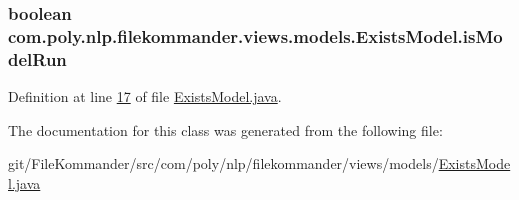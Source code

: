 \hypertarget{classcom_1_1poly_1_1nlp_1_1filekommander_1_1views_1_1models_1_1_exists_model_aa20f1308ab4764740262516e4c0b544e}{
\subsubsection[{is\-Model\-Run}]{\setlength{\rightskip}{0pt plus 5cm}boolean com.\-poly.\-nlp.\-filekommander.\-views.\-models.\-Exists\-Model.\-is\-Model\-Run\hspace{0.3cm}{\ttfamily [private]}}}\label{classcom_1_1poly_1_1nlp_1_1filekommander_1_1views_1_1models_1_1_exists_model_aa20f1308ab4764740262516e4c0b544e}


Definition at line \hyperlink{L17}{17} of file \hyperlink{}{Exists\-Model.\-java}.



The documentation for this class was generated from the following file\-:\begin{DoxyCompactItemize}
\item 
git/\-File\-Kommander/src/com/poly/nlp/filekommander/views/models/\hyperlink{_exists_model_8java}{Exists\-Model.\-java}\end{DoxyCompactItemize}
